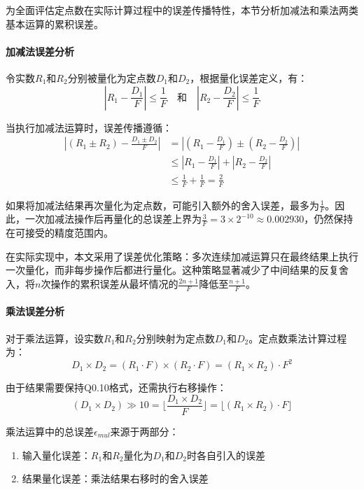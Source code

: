 为全面评估定点数在实际计算过程中的误差传播特性，本节分析加减法和乘法两类基本运算的累积误差。

\paragraph{加减法误差分析}\quad 
令实数$R_1$和$R_2$分别被量化为定点数$D_1$和$D_2$，根据量化误差定义，有：
\begin{equation}
|R_1 - \frac{D_1}{F}| \leq \frac{1}{F} \quad \text{和} \quad |R_2 - \frac{D_2}{F}| \leq \frac{1}{F}
\end{equation}

当执行加减法运算时，误差传播遵循：
\begin{equation}
\begin{aligned}
|(R_1 \pm R_2) - \frac{D_1 \pm D_2}{F}| &= |(R_1 - \frac{D_1}{F}) \pm (R_2 - \frac{D_2}{F})| \\
&\leq |R_1 - \frac{D_1}{F}| + |R_2 - \frac{D_2}{F}| \\
&\leq \frac{1}{F} + \frac{1}{F} = \frac{2}{F}
\end{aligned}
\end{equation}

如果将加减法结果再次量化为定点数，可能引入额外的舍入误差，最多为$\frac{1}{F}$。因此，一次加减法操作后再量化的总误差上界为$\frac{3}{F} = 3 \times 2^{-10} \approx 0.002930$，仍然保持在可接受的精度范围内。

在实际实现中，本文采用了误差优化策略：多次连续加减运算只在最终结果上执行一次量化，而非每步操作后都进行量化。这种策略显著减少了中间结果的反复舍入，将$n$次操作的累积误差从最坏情况的$\frac{2n+1}{F}$降低至$\frac{n+1}{F}$。

\paragraph{乘法误差分析}\quad
对于乘法运算，设实数$R_1$和$R_2$分别映射为定点数$D_1$和$D_2$。定点数乘法计算过程为：
\begin{equation}
D_1 \times D_2 = (R_1 \cdot F) \times (R_2 \cdot F) = (R_1 \times R_2) \cdot F^2
\end{equation}

由于结果需要保持Q0.10格式，还需执行右移操作：
\begin{equation}
(D_1 \times D_2) \gg 10 = \lfloor \frac{D_1 \times D_2}{F} \rfloor = \lfloor (R_1 \times R_2) \cdot F \rfloor
\end{equation}

乘法运算中的总误差$\epsilon_{mul}$来源于两部分：
\begin{enumerate}
    \item 输入量化误差：$R_1$和$R_2$量化为$D_1$和$D_2$时各自引入的误差
    \item 结果量化误差：乘法结果右移时的舍入误差
\end{enumerate}

